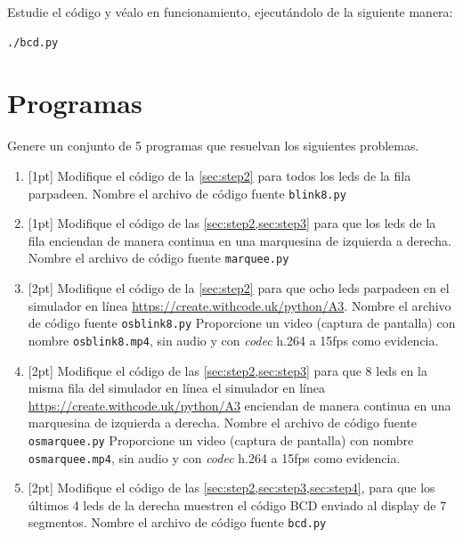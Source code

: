 \documentclass[letterpaper,10.5pt]{article}
\begin{document}
\smallskip

\smallskip

Estudie el código y véalo en funcionamiento, ejecutándolo de la siguiente manera:
\begin{Verbatim}[fontsize=\footnotesize]
./bcd.py
\end{Verbatim}

%
%
\section{Programas}%
\label{sec:programs}

Genere un conjunto de 5 programas que resuelvan los siguientes problemas.

\begin{enumerate}
	\item{} [1pt] Modifique el código de la \cref{sec:step2} para todos los leds de la fila parpadeen.
	Nombre el archivo de código fuente \texttt{blink8.py}

	\item{} [1pt] Modifique el código de las \cref{sec:step2,sec:step3} para que los leds de la fila enciendan de manera continua en una marquesina de izquierda a derecha.
	Nombre el archivo de código fuente \texttt{marquee.py}

	\item{} [2pt] Modifique el código de la \cref{sec:step2} para que ocho leds parpadeen en el simulador en línea \url{https://create.withcode.uk/python/A3}.
	Nombre el archivo de código fuente \texttt{osblink8.py}
	Proporcione un video (captura de pantalla) con nombre \texttt{osblink8.mp4}, sin audio y con \emph{codec} h.264 a 15fps como evidencia.

	\item{} [2pt] Modifique el código de las \cref{sec:step2,sec:step3} para que 8 leds en la misma fila del simulador en línea el simulador en línea \url{https://create.withcode.uk/python/A3} enciendan de manera continua en una marquesina de izquierda a derecha.
	Nombre el archivo de código fuente \texttt{osmarquee.py}
	Proporcione un video (captura de pantalla) con nombre \texttt{osmarquee.mp4}, sin audio y con \emph{codec} h.264 a 15fps como evidencia.

	\item{} [2pt] Modifique el código de las \cref{sec:step2,sec:step3,sec:step4}, para que los últimos 4 leds de la derecha muestren el código BCD enviado al display de 7 segmentos.
	Nombre el archivo de código fuente \texttt{bcd.py}
\end{enumerate}
\end{document}
